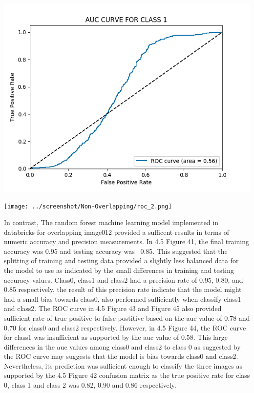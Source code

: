 \documentclass[12pt]{article}
\begin{document}
\begin{multicols*}{2}
\begin{center}
	\includegraphics[scale=0.3]{../screenshot/Non-Overlapping/roc_1.png}

	\texttt{[image: ../screenshot/Non-Overlapping/roc\_2.png]}
  \end{center}
 
  \hspace*{5mm} In contrast, The random forest machine learning model implemented in databricks for overlapping image012 provided a sufficent results in terms of numeric
  accuracy and precision measurements. In 4.5 Figure 41, the final training accuracy was 0.95 and testing accuracy was ~0.85. This suggested that the splitting of training and testing data provided a slightly less
  balanced data for the model to use as indicated by the small differences in training and testing accuracy values. Class0, class1 and class2 had a precision rate of 0.95, 0.80, and 0.85 respectively, the result of this
  precision rate indicate that the model might had a small bias towards class0, also performed sufficiently when classify class1 and class2. The ROC curve in 4.5 Figure 43 and Figure 45 also provided sufficient rate of true positive to false postitive based on the auc value of 0.78 and 0.70
  for class0 and class2 respectively. However, in 4.5 Figure 44, the ROC curve for class1 was insufficient as supported by the auc value of 0.58.  
  This large differences in the auc values among class0 and class2 to class 0 as suggested by the ROC curve may suggests that the model is bias towards class0 and  class2.
  Nevertheless, its prediction was sufficient enough to classify the three images as supported by the 4.5 Figure 42 confusion matrix as the true positive rate for class 0, class 1 and class 2 was 0.82, 0.90 and 0.86 respectively.  


\end{multicols*}
\end{document}
